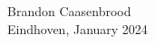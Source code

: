 \documentclass[a5paper]{article}
\begin{document}
\vfill
\begin{flushright}
Brandon Caasenbrood \\[0.15em]
Eindhoven, January 2024
\end{flushright} 

\begin{center}
\end{center}

\end{document}
